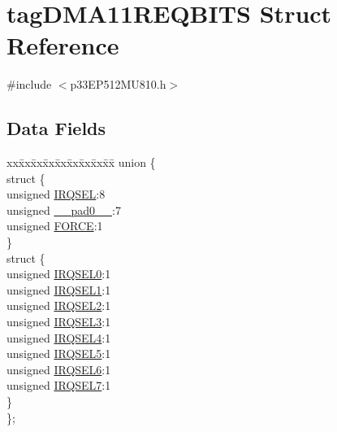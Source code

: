\hypertarget{structtag_d_m_a11_r_e_q_b_i_t_s}{}\section{tag\+D\+M\+A11\+R\+E\+Q\+B\+I\+TS Struct Reference}
\label{structtag_d_m_a11_r_e_q_b_i_t_s}


{\ttfamily \#include $<$p33\+E\+P512\+M\+U810.\+h$>$}

\subsection*{Data Fields}
\begin{DoxyCompactItemize}
\item 
\begin{tabbing}
xx\=xx\=xx\=xx\=xx\=xx\=xx\=xx\=xx\=\kill
union \{\\
\>struct \{\\
\>\>unsigned \hyperlink{structtag_d_m_a11_r_e_q_b_i_t_s_a5e70ba01366ab2f37371d52661dd93b2}{IRQSEL}:8\\
\>\>unsigned \hyperlink{structtag_d_m_a11_r_e_q_b_i_t_s_adf71f3d8410c1f1dbbc96680a92c49af}{\_\_pad0\_\_}:7\\
\>\>unsigned \hyperlink{structtag_d_m_a11_r_e_q_b_i_t_s_a9b378a7ffc1ab4bc4a3710fb36389180}{FORCE}:1\\
\>\} \\
\>struct \{\\
\>\>unsigned \hyperlink{structtag_d_m_a11_r_e_q_b_i_t_s_ac73241b8f783760c9192dfd8a0773cad}{IRQSEL0}:1\\
\>\>unsigned \hyperlink{structtag_d_m_a11_r_e_q_b_i_t_s_a45e1f083e5a8a59f25acc35910732426}{IRQSEL1}:1\\
\>\>unsigned \hyperlink{structtag_d_m_a11_r_e_q_b_i_t_s_a60dda7474727b3624ca25fa0067a8924}{IRQSEL2}:1\\
\>\>unsigned \hyperlink{structtag_d_m_a11_r_e_q_b_i_t_s_aeaafe1b8c89398ed382054ab628aed78}{IRQSEL3}:1\\
\>\>unsigned \hyperlink{structtag_d_m_a11_r_e_q_b_i_t_s_a91c4162e0f3d4ac7adcdb49302f19840}{IRQSEL4}:1\\
\>\>unsigned \hyperlink{structtag_d_m_a11_r_e_q_b_i_t_s_a6382d50430464cf20b3dee3dbf2e8c01}{IRQSEL5}:1\\
\>\>unsigned \hyperlink{structtag_d_m_a11_r_e_q_b_i_t_s_ace52408ef8c29561f3c56a3fbcbc8217}{IRQSEL6}:1\\
\>\>unsigned \hyperlink{structtag_d_m_a11_r_e_q_b_i_t_s_acce7dedecdf1f53cdbead3edf7c5d53a}{IRQSEL7}:1\\
\>\} \\
\}; \\

\end{tabbing}\end{DoxyCompactItemize}


